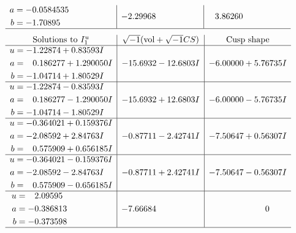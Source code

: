 \documentclass[1p]{elsarticle_modified}
\theoremstyle{definition}
\newcommand{\I}{\sqrt{-1}}
\begin{document}
$$\begin{array}{c|c|c}
\begin{aligned}
a &= -0.0584535\phantom{ +0.000000I} \\
b &= -1.70895\phantom{ +0.000000I}\end{aligned}
 & -2.29968\phantom{ +0.000000I} & \phantom{-}3.86260\phantom{ +0.000000I}\\
 \hline 
 \end{array}$$\newpage$$\begin{array}{c|c|c}  
\text{Solutions to }I^u_{1}& \I (\text{vol} + \sqrt{-1}CS) & \text{Cusp shape}\\
 \hline 
\begin{aligned}
u &= -1.22874 + 0.83593 I \\
a &= \phantom{-}0.186277 + 1.290050 I \\
b &= -1.04714 + 1.80529 I\end{aligned}
 & -15.6932 - 12.6803 I & -6.00000 + 5.76735 I \\ \hline\begin{aligned}
u &= -1.22874 - 0.83593 I \\
a &= \phantom{-}0.186277 - 1.290050 I \\
b &= -1.04714 - 1.80529 I\end{aligned}
 & -15.6932 + 12.6803 I & -6.00000 - 5.76735 I \\ \hline\begin{aligned}
u &= -0.364021 + 0.159376 I \\
a &= -2.08592 + 2.84763 I \\
b &= \phantom{-}0.575909 + 0.656185 I\end{aligned}
 & -0.87711 - 2.42741 I & -7.50647 + 0.56307 I \\ \hline\begin{aligned}
u &= -0.364021 - 0.159376 I \\
a &= -2.08592 - 2.84763 I \\
b &= \phantom{-}0.575909 - 0.656185 I\end{aligned}
 & -0.87711 + 2.42741 I & -7.50647 - 0.56307 I \\ \hline\begin{aligned}
u &= \phantom{-}2.09595\phantom{ +0.000000I} \\
a &= -0.386813\phantom{ +0.000000I} \\
b &= -0.373598\phantom{ +0.000000I}\end{aligned}
 & -7.66684\phantom{ +0.000000I} & \phantom{-0.000000 } 0\\
 \hline 
 \end{array}$$\newpage\newpage\renewcommand{\arraystretch}{1}
\end{document}
